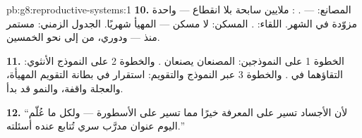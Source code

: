 \begin{solution}{pb:g8:reproductive-systems:1}
\textbf{10.} المصانع:  --- . : ملايين سابحة
بلا انقطاع ---  واحدة مزوّدة في الشهر. اللقاء:
. المسكن: لا مسكن ---  المهيأ شهريًا.
الجدول الزمني: مستمر منذ  --- ودوري، من  إلى
نحو الخمسين.

\textbf{11.} الخطوة 1 على النموذجين: المصنعان يصنعان
. والخطوة 2 على النموذج الأنثوي: التقاؤهما في
. والخطوة 3 عبر النموذج والتقويم: استقرار
 في بطانة التقويم المهيأة، والعجلة واقفة، والنمو
قد بدأ.

\textbf{12.} ``لأن الأجساد تسير على المعرفة خيرًا مما
تسير على الأسطورة --- ولكل ما عُلّم اليوم عنوان مدرَّب
سري تُتابع عنده أسئلته.''
\end{solution}
